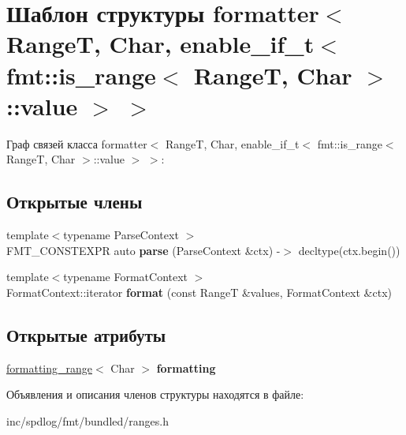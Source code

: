 \hypertarget{structformatter_3_01RangeT_00_01Char_00_01enable__if__t_3_01fmt_1_1is__range_3_01RangeT_00_01Char_01_4_1_1value_01_4_01_4}{}\section{Шаблон структуры formatter$<$ RangeT, Char, enable\+\_\+if\+\_\+t$<$ fmt\+:\+:is\+\_\+range$<$ RangeT, Char $>$\+:\+:value $>$ $>$}
\label{structformatter_3_01RangeT_00_01Char_00_01enable__if__t_3_01fmt_1_1is__range_3_01RangeT_00_01Char_01_4_1_1value_01_4_01_4}


Граф связей класса formatter$<$ RangeT, Char, enable\+\_\+if\+\_\+t$<$ fmt\+:\+:is\+\_\+range$<$ RangeT, Char $>$\+:\+:value $>$ $>$\+:
\subsection*{Открытые члены}
\begin{DoxyCompactItemize}
\item 
\mbox{\label{structformatter_3_01RangeT_00_01Char_00_01enable__if__t_3_01fmt_1_1is__range_3_01RangeT_00_01Char_01_4_1_1value_01_4_01_4_a782c0bc783fefbb7dbb17c0dadadc303}} 
{\footnotesize template$<$typename Parse\+Context $>$ }\\F\+M\+T\+\_\+\+C\+O\+N\+S\+T\+E\+X\+PR auto {\bfseries parse} (Parse\+Context \&ctx) -\/$>$ decltype(ctx.\+begin())
\item 
\mbox{\label{structformatter_3_01RangeT_00_01Char_00_01enable__if__t_3_01fmt_1_1is__range_3_01RangeT_00_01Char_01_4_1_1value_01_4_01_4_a65303a5b7bfb54fbe68d98c8acdaf05a}} 
{\footnotesize template$<$typename Format\+Context $>$ }\\Format\+Context\+::iterator {\bfseries format} (const RangeT \&values, Format\+Context \&ctx)
\end{DoxyCompactItemize}
\subsection*{Открытые атрибуты}
\begin{DoxyCompactItemize}
\item 
\mbox{\label{structformatter_3_01RangeT_00_01Char_00_01enable__if__t_3_01fmt_1_1is__range_3_01RangeT_00_01Char_01_4_1_1value_01_4_01_4_aa376ac1ec68d86ae1c7feb390bf5588e}} 
\hyperlink{structformatting__range}{formatting\+\_\+range}$<$ Char $>$ {\bfseries formatting}
\end{DoxyCompactItemize}


Объявления и описания членов структуры находятся в файле\+:\begin{DoxyCompactItemize}
\item 
inc/spdlog/fmt/bundled/ranges.\+h\end{DoxyCompactItemize}
